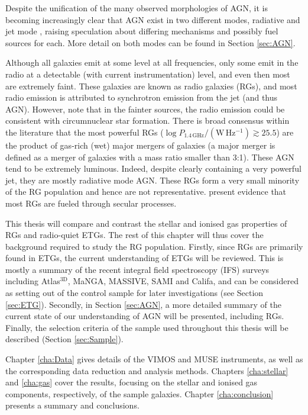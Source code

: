 	Despite the unification of the many observed morphologies of AGN, it is becoming increasingly clear that AGN exist in two different modes, radiative and jet mode \citep[e.g.][]{Antonucci2012}, raising speculation about differing mechanisms and possibly fuel sources for each. More detail on both modes can be found in Section \ref{sec:AGN}. 



	Although all galaxies emit at some level at all frequencies, only some emit in the radio at a detectable (with current instrumentation) level, and even then most are extremely faint. These galaxies are known as radio galaxies (RGs), and most radio emission is attributed to synchrotron emission from the jet (and thus AGN). However, \citet{Nyland2016} note that in the fainter sources, the radio emission could be consistent with circumnuclear star formation. There is broad consensus within the literature that the most powerful RGs ($\log P_\mathrm{1.4\, GHz}/(\mathrm{W \, Hz^{-1}}) \gtrsim 25.5$) are the product of gas-rich (wet) major mergers of galaxies (a major merger is defined as a merger of galaxies with a mass ratio smaller than 3:1). These AGN tend to be extremely luminous. Indeed, despite clearly containing a very powerful jet, they are mostly radiative mode AGN. These RGs form a very small minority of the RG population and hence are not representative. \citet{Heckman2014} present evidence that most RGs are fueled through secular processes. 

	This thesis will compare and contrast the stellar and ionised gas properties of RGs and radio-quiet ETGs. The rest of this chapter will thus cover the background required to study the RG population. Firstly, since RGs are primarily found in ETGs, the current understanding of ETGs will be reviewed. This is mostly a summary of the recent integral field spectroscopy (IFS) surveys including Atlas$^\text{3D}$, MaNGA, MASSIVE, SAMI and Califa, and can be considered as setting out of the control sample for later investigations (see Section \ref{sec:ETG}). Secondly, in Section \ref{sec:AGN}, a more detailed summary of the current state of our understanding of AGN will be presented, including RGs. Finally, the selection criteria of the sample used throughout this thesis will be described (Section \ref{sec:Sample}).

	Chapter \ref{cha:Data} gives details of the VIMOS and MUSE instruments, as well as the corresponding data reduction and analysis methods. Chapters \ref{cha:stellar} and \ref{cha:gas} cover the results, focusing on the stellar and ionised gas components, respectively, of the sample galaxies. Chapter \ref{cha:conclusion} presents a summary and conclusions. 

